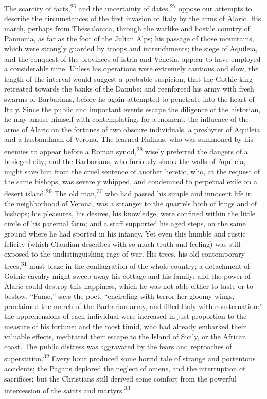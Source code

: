 The scarcity of facts,\textsuperscript{26} and the uncertainty of dates,\textsuperscript{27} oppose
our attempts to describe the circumstances of the first invasion
of Italy by the arms of Alaric. His march, perhaps from
Thessalonica, through the warlike and hostile country of
Pannonia, as far as the foot of the Julian Alps; his passage of
those mountains, which were strongly guarded by troops and
intrenchments; the siege of Aquileia, and the conquest of the
provinces of Istria and Venetia, appear to have employed a
considerable time. Unless his operations were extremely cautious
and slow, the length of the interval would suggest a probable
suspicion, that the Gothic king retreated towards the banks of
the Danube; and reenforced his army with fresh swarms of
Barbarians, before he again attempted to penetrate into the heart
of Italy. Since the public and important events escape the
diligence of the historian, he may amuse himself with
contemplating, for a moment, the influence of the arms of Alaric
on the fortunes of two obscure individuals, a presbyter of
Aquileia and a husbandman of Verona. The learned Rufinus, who was
summoned by his enemies to appear before a Roman synod,\textsuperscript{28} wisely
preferred the dangers of a besieged city; and the Barbarians, who
furiously shook the walls of Aquileia, might save him from the
cruel sentence of another heretic, who, at the request of the
same bishops, was severely whipped, and condemned to perpetual
exile on a desert island.\textsuperscript{29} The old man,\textsuperscript{30} who had passed his
simple and innocent life in the neighborhood of Verona, was a
stranger to the quarrels both of kings and of bishops; his
pleasures, his desires, his knowledge, were confined within the
little circle of his paternal farm; and a staff supported his
aged steps, on the same ground where he had sported in his
infancy. Yet even this humble and rustic felicity (which Claudian
describes with so much truth and feeling) was still exposed to
the undistinguishing rage of war. His trees, his old contemporary
trees,\textsuperscript{31} must blaze in the conflagration of the whole country; a
detachment of Gothic cavalry might sweep away his cottage and his
family; and the power of Alaric could destroy this happiness,
which he was not able either to taste or to bestow. “Fame,” says
the poet, “encircling with terror her gloomy wings, proclaimed
the march of the Barbarian army, and filled Italy with
consternation:” the apprehensions of each individual were
increased in just proportion to the measure of his fortune: and
the most timid, who had already embarked their valuable effects,
meditated their escape to the Island of Sicily, or the African
coast. The public distress was aggravated by the fears and
reproaches of superstition.\textsuperscript{32} Every hour produced some horrid
tale of strange and portentous accidents; the Pagans deplored the
neglect of omens, and the interruption of sacrifices; but the
Christians still derived some comfort from the powerful
intercession of the saints and martyrs.\textsuperscript{33}

